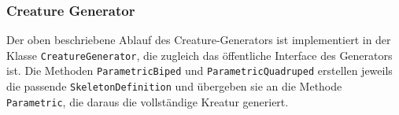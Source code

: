 \subsubsection{Creature Generator}
Der oben beschriebene Ablauf des Creature-Generators ist implementiert in der Klasse \texttt{Creature\-Generator}, die zugleich das öffentliche Interface des Generators ist. Die Methoden \texttt{Parametric\-Biped} und \texttt{Parametric\-Quadruped} erstellen jeweils die passende \texttt{Skeleton\-Definition} und übergeben sie an die Methode \texttt{Parametric}, die daraus die vollständige Kreatur generiert.
